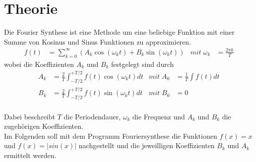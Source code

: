 \section{Theorie}
\label{sec:Theorie}
Die Fourier Synthese ist eine Methode um eine beliebige Funktion mit einer Summe von Kosinus und Sinus Funktionen zu approximieren.
\begin{align}
    f(t) &= \sum_{k=0}^{\infty} (A_k\cos(\omega_k t)+B_k\sin(\omega_k t)) &   mit \; \omega_k &= \frac{2\pi k}{T}
\end{align}
wobei die Koeffizienten $A_k$ und $B_k$ festgelegt sind durch
\begin{align}
    A_k &= \frac{2}{T} \int_{-T/2}^{+T/2} f(t)\cos(\omega_k t) dt    &  mit \; A_0 &= \frac{1}{T} \int f(t) dt \\
    B_k &= \frac{2}{T} \int_{-T/2}^{+T/2} f(t)\sin(\omega_k t) dt    &  mit \; B_0 &= 0
\end{align}
\\
Dabei beschreibt $T$ die Periodendauer, $\omega_k$ die Frequenz und $A_k$ und $B_k$ die zugehörigen Koeffizienten. \\
Im Folgenden soll mit dem Programm Fouriersynthese %
die Funktionen $f(x)=x$ und $f(x)=|sin(x)|$ nachgestellt und die jeweilligen Koeffizienten $B_k$ und $A_k$ ermittelt werden.
